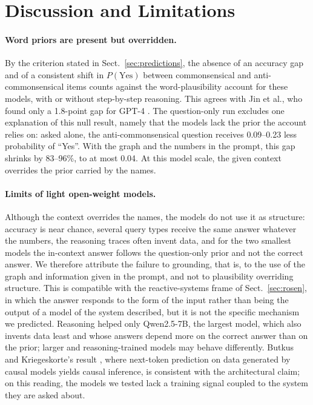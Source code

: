 \documentclass{llncs}
\begin{document}
\section{Discussion and Limitations}
\label{sec:discussion}

\paragraph{Word priors are present but overridden.} By the criterion stated in Sect.~\ref{sec:predictions}, the absence of an accuracy gap and of a consistent shift in $P(\text{Yes})$ between commonsensical and anti-commonsensical items counts against the word-plausibility account for these models, with or without step-by-step reasoning. This agrees with Jin et al., who found only a 1.8-point gap for GPT-4 \cite{jin2023cladder}. The question-only run excludes one explanation of this null result, namely that the models lack the prior the account relies on: asked alone, the anti-commonsensical question receives 0.09--0.23 less probability of ``Yes''. With the graph and the numbers in the prompt, this gap shrinks by 83--96\%, to at most 0.04. At this model scale, the given context overrides the prior carried by the names.

\paragraph{Limits of light open-weight models.} Although the context overrides the names, the models do not use it as structure: accuracy is near chance, several query types receive the same answer whatever the numbers, the reasoning traces often invent data, and for the two smallest models the in-context answer follows the question-only prior and not the correct answer. We therefore attribute the failure to grounding, that is, to the use of the graph and information given in the prompt, and not to plausibility overriding structure. This is compatible with the reactive-systems frame of Sect.~\ref{sec:rosen}, in which the answer responds to the form of the input rather than being the output of a model of the system described, but it is not the specific mechanism we predicted. Reasoning helped only Qwen2.5-7B, the largest model, which also invents data least and whose answers depend more on the correct answer than on the prior; larger and reasoning-trained models may behave differently. Butkus and Kriegeskorte's result \cite{butkus2025causal}, where next-token prediction on data generated by causal models yields causal inference, is consistent with the architectural claim; on this reading, the models we tested lack a training signal coupled to the system they are asked about.
\end{document}
